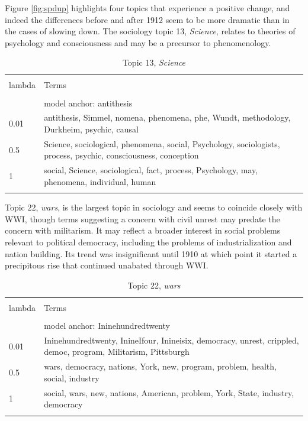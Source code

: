 \documentclass[]{book}
\theoremstyle{definition}
\theoremstyle{definition}
\theoremstyle{definition}
\theoremstyle{remark}
\begin{document}
Figure \ref{fig:spdup} highlights four topics that experience a positive
change, and indeed the differences before and after 1912 seem to be more
dramatic than in the cases of slowing down. The sociology topic 13,
\emph{Science}, relates to theories of psychology and consciousness and
may be a precursor to phenomenology.



\begin{table}[!htbp] \centering 
  \caption{Topic 13, \emph{Science}} 
  \label{tab:t13-h} 
\begin{tabularx}{\textwidth}{@{\extracolsep{5pt}} lY} 
\\[-1.8ex]\hline 
\hline \\[-1.8ex] 
lambda & Terms \\ 
\hline \\[-1.8ex] 
 & model anchor: antithesis \\ 
0.01 & antithesis, Simmel, nomena, phenomena, phe, Wundt, methodology, Durkheim, psychic, causal \\ 
0.5 & Science, sociological, phenomena, social, Psychology, sociologists, process, psychic, consciousness, conception \\ 
1 & social, Science, sociological, fact, process, Psychology, may, phenomena, individual, human \\ 
\hline \\[-1.8ex] 
\end{tabularx} 
\end{table}

Topic 22, \emph{wars}, is the largest topic in sociology and seems to
coincide closely with WWI, though terms suggesting a concern with civil
unrest may predate the concern with militarism. It may reflect a broader
interest in social problems relevant to political democracy, including
the problems of industrialization and nation building. Its trend was
insignificant until 1910 at which point it started a precipitous rise
that continued unabated through WWI.



\begin{table}[!htbp] \centering 
  \caption{Topic 22, \emph{wars}} 
  \label{tab:t22-h} 
\begin{tabularx}{\textwidth}{@{\extracolsep{5pt}} lY} 
\\[-1.8ex]\hline 
\hline \\[-1.8ex] 
lambda & Terms \\ 
\hline \\[-1.8ex] 
 & model anchor: Ininehundredtwenty \\ 
0.01 & Ininehundredtwenty, InineIfour, Inineisix, democracy, unrest, crippled, democ, program, Militarism, Pittsburgh \\ 
0.5 & wars, democracy, nations, York, new, program, problem, health, social, industry \\ 
1 & social, wars, new, nations, American, problem, York, State, industry, democracy \\ 
\hline \\[-1.8ex] 
\end{tabularx} 
\end{table}
\end{document}

